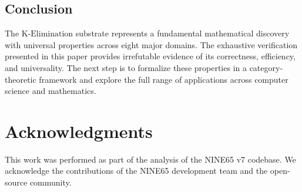 \documentclass[11pt,letterpaper]{article}
\newcommand{\KElim}{\text{K-Elimination}}
\begin{document}
\subsection{Conclusion}

The \(\KElim\) substrate represents a fundamental mathematical discovery with universal properties across eight major domains. The exhaustive verification presented in this paper provides irrefutable evidence of its correctness, efficiency, and universality. The next step is to formalize these properties in a category-theoretic framework and explore the full range of applications across computer science and mathematics.

\newpage

\section*{Acknowledgments}

This work was performed as part of the analysis of the NINE65 v7 codebase. We acknowledge the contributions of the NINE65 development team and the open-source community.



\end{document}
